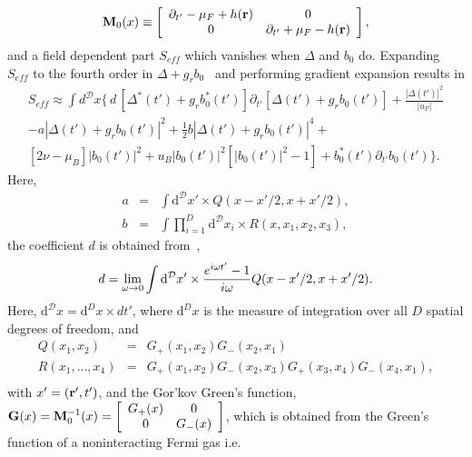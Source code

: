 \documentclass[a4paper,10pt]{article}
\begin{document}
\begin{equation} 
{\bf M}_0(x)\equiv\left[ \begin{array}{cc}\partial_{t'}-\mu_F+h({\bf r})&0\\
0&\partial_{t'}+\mu_F-{h}({\bf r})\end{array}\right], 
\end{equation}
and a field dependent part $S_{eff}$ which vanishes when $\Delta$ and $b_0$ do. Expanding $S_{eff}$ to the fourth order in
$\Delta + g_rb_0$~\cite{huang:bcsbecgp} and performing gradient expansion results in
\begin{multline}
\label{gdexp}
S_{eff}\approx\int{d}^{\mathcal{D}}x\bigg\{\,d\,\left[\Delta^*(t')+g_rb^*_0(t')\right]\partial_{t'}\left[ \Delta(t') + g_rb^{ }_0(t') \right]+
 \frac{|\Delta(t')|^2}{|u_F|}\\
-a|\Delta(t')+g_rb^{ }_0(t')|^2+ \frac{1}{2}b|\Delta(t')+g_rb^{ }_0(t')|^4+ \\ 
\left[2\nu-\mu_B\right]|b_0(t')|^2  + u_B|b_0(t')|^2\left[|b_0(t')|^2-1 \right]  +b^*_0(t')\partial_{t'}b^{ }_0(t')\bigg\}.
\end{multline}
Here,
\begin{eqnarray}
\label{abc}
a&=& \int{\mathrm d}^{\mathcal{D}}x'\times Q(x-x'/2,x+x'/2),\nonumber\\
b&=&\int{\prod_{i=1}^D{\mathrm d}^{\mathcal{D}}x_i} \times R(x,x_1,x_2,x_3),
\end{eqnarray}
the coefficient $d$ is obtained from~\cite{machida:dynamics},
\begin{equation}
\label{d}
d=\lim_{\omega\rightarrow 0}\int{\mathrm d}^{\mathcal{D}}x'\times {e^{i\omega{t'}}-1\over i\omega} Q(x-x'/2,x+x'/2).
\end{equation} 
Here, ${\mathrm d}^{\mathcal{D}}x={\mathrm d}^Dx \times dt'$, where ${\mathrm d}^{D}x$ is the measure of integration over all $D$ spatial degrees of freedom, and 
\begin{eqnarray} 
Q(x_1,x_2) &=& G_+(x_1,x_2)G_-(x_2,x_1) \nonumber \\
R(x_1,...,x_4)&=&G_+(x_1,x_2)G_-(x_2,x_3)G_+(x_3,x_4)G_-(x_4,x_1),\nonumber \\
\end{eqnarray}
with $x'=({\bf r}',t')$, and the Gor'kov Green's function, $ {\bf G}(x)= {\bf M}^{-1}_0(x)=\bigg[\begin{array}{cc}G_+(x)&0\\
0&G_-(x)\end{array}\bigg]$, which is obtained from the Green's function of a noninteracting Fermi gas i.e.
\end{document}
